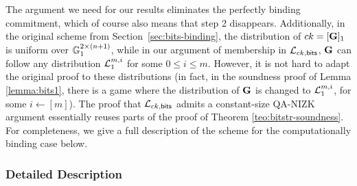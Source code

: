The argument we need for our results eliminates the perfectly binding commitment, which of course also means that step 2 disappears. Additionally, in the original scheme from Section~\ref{sec:bits-binding}, the distribution of $ck=[\mathbf{{G}}]_1$ is uniform over $\mathbb{G}_1^{2\times(n+1)}$, while in our argument of membership in 
$\mathcal{L}_{ck,\mathsf{bits}}$, $\mathbf{{G}}$ can follow any distribution $\mathcal{L}_1^{m,i}$ for some $0 \leq i \leq m$. 
However, it is not hard to adapt the original proof to these distributions (in fact, in the soundness proof of 
Lemma \ref{lemma:bits1}, there is a game where the distribution of $\mathbf{{G}}$ is changed to $\mathcal{L}_1^{m,i}$, for some $i \gets [m]$). The proof that $\mathcal{L}_{ck,\mathsf{bits}}$ admits a constant-size QA-NIZK argument essentially reuses parts of the proof of Theorem \ref{teo:bitstr-soundness}. For completeness, we give a full description of the scheme for the computationally binding case below. 

\subsubsection{Detailed Description}


